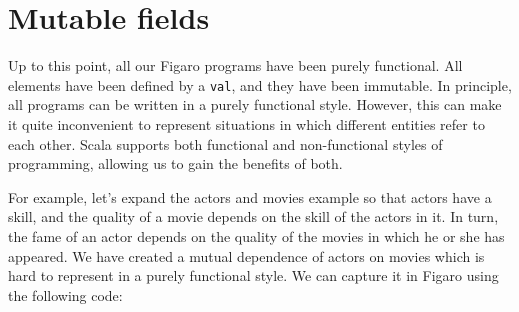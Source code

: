 \section{Mutable fields}

Up to this point, all our Figaro programs have been purely functional. All elements have been defined by a \texttt{val}, and they have been immutable. In principle, all programs can be written in a purely functional style. However, this can make it quite inconvenient to represent situations in which different entities refer to each other. Scala supports both functional and non-functional styles of programming, allowing us to gain the benefits of both.

For example, let's expand the actors and movies example so that actors have a skill, and the quality of a movie depends on the skill of the actors in it. In turn, the fame of an actor depends on the quality of the movies in which he or she has appeared. We have created a mutual dependence of actors on movies which is hard to represent in a purely functional style. We can capture it in Figaro using the following code:

